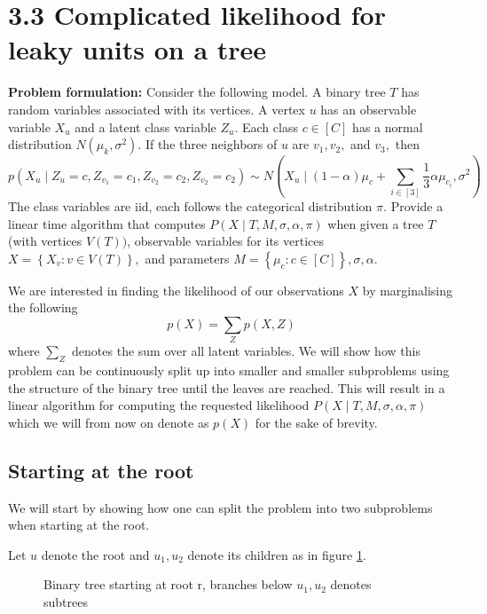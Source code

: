 \section*{3.3 Complicated likelihood for leaky units on a tree}
\begin{tcolorbox}
  \textbf{Problem formulation:} Consider the following model. A binary tree $T$ has random variables associated with its vertices. A vertex $u$ has an observable variable $X_{u}$ and a latent class variable $Z_{u} .$ Each class $c \in[C]$ has a normal distribution $N\left(\mu_{k}, \sigma^{2}\right) .$ If the three neighbors of $u$ are $v_{1}, v_{2},$ and $v_{3},$ then
  $$
  p\left(X_{u} \mid Z_{u}=c, Z_{v_{1}}=c_{1}, Z_{v_{2}}=c_{2}, Z_{v_{2}}=c_{2}\right) \sim N\left(X_{u} \mid(1-\alpha) \mu_{c}+\sum_{i \in[3]} \frac{1}{3} \alpha \mu_{c_{i}}, \sigma^{2}\right)
  $$
  The class variables are iid, each follows the categorical distribution $\pi .$ Provide a linear time algorithm that computes $P(X \mid T, M, \sigma, \alpha, \pi)$ when given a tree $T$ (with vertices $V(T))$, observable variables for its vertices $X=\left\{X_{v}: v \in V(T)\right\},$ and parameters $M=\left\{\mu_{c}: c \in[C]\right\}, \sigma, \alpha .$
\end{tcolorbox}
We are interested in finding the likelihood of our observations $X$ by marginalising the following
\begin{equation}
  p(X) = \sum_Z p(X,Z)
\end{equation}
where $\sum_Z$ denotes the sum over all latent variables. We will show how this problem can be continuously split up into smaller and smaller subproblems using the structure of the binary tree until the leaves are reached. This will result in a linear algorithm for computing the requested likelihood $P(X \mid T, M, \sigma, \alpha, \pi)$ which we will from now on denote as $p(X)$ for the sake of brevity.

\subsection*{Starting at the root}
We will start by showing how one can split the problem into two subproblems when starting at the root.

Let $u$ denote the root and $u_1, u_2$ denote its children as in figure \ref{root_case}.
\begin{figure}[H]
\begin{center}
\end{center}
\caption{Binary tree starting at root r, branches below $u_1, u_2$ denotes subtrees}
\label{root_case}
\end{figure}

